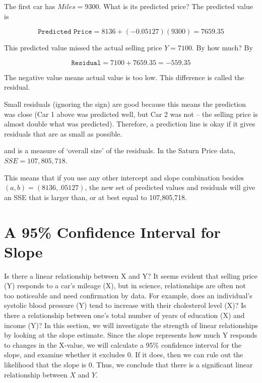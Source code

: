 \documentclass[11pt, chapterprefix=true]{scrbook}\usepackage[]{graphicx}\usepackage[]{color}
\begin{document}
The first car has $Miles = 9300$.  What is its predicted price?  The predicted value is 

\begin{equation*}
  \texttt{Predicted Price} = 8136 + (-0.05127)(9300) = 7659.35
\end{equation*}

This predicted value missed the actual selling price $Y = 7100$.  By how much? By

\begin{equation*}
  \texttt{Residual} = 7100 + 7659.35 = -559.35
\end{equation*}

The negative value means actual value is too low.  This difference is called the residual.  

Small residuals (ignoring the sign) are good because this means the prediction was close  (Car 1 above was predicted well, but Car 2 was not -- the selling price is almost double what was predicted).  Therefore, a prediction line is okay if it gives residuals that are as small as possible.  

\begin{center}
\end{center}

and is a measure of `overall size' of the residuals.  In the Saturn Price data, \\
$SSE =  107,805,718$.

\begin{center}
\end{center}

This means that if you use any other intercept and slope combination besides $(a,b) = (8136,.05127)$, the new set of predicted values and residuals will give an SSE that is larger than, or at best equal to 107,805,718. 

\section{A 95\% Confidence Interval for Slope}

Is there a linear relationship between X and Y?  It seems evident that selling price (Y) responds to a car's mileage (X), but in science, relationships are often not too noticeable and need confirmation by data.  For example, does an individual's systolic blood pressure (Y) tend to increase with their cholesterol level (X)?   Is there a relationship between one's total number of years of education (X) and income (Y)?  In this section, we will investigate the strength of linear relationships by looking at the slope estimate.  Since the slope represents how much Y responds to changes in the X-value, we will calculate a 95\% confidence interval for the slope, and examine whether it excludes 0.  If it does, then we can rule out the likelihood that the slope is 0.  Thus, we conclude that there is a significant linear relationship between $X$ and $Y$.
\end{document}
